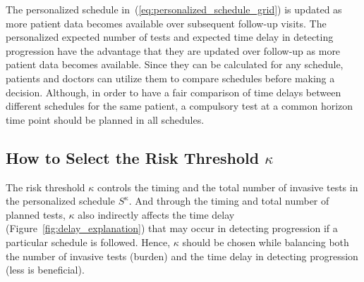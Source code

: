 The personalized schedule in~(\ref{eq:personalized_schedule_grid}) is updated as more patient data becomes available over subsequent follow-up visits. The personalized expected number of tests and expected time delay in detecting progression have the advantage that they are updated over follow-up as more patient data becomes available. Since they can be calculated for any schedule, patients and doctors can utilize them to compare schedules before making a decision. Although, in order to have a fair comparison of time delays between different schedules for the same patient, a compulsory test at a common horizon time point should be planned in all schedules.

\subsection{How to Select the Risk Threshold $\kappa$}
The risk threshold $\kappa$ controls the timing and the total number of invasive tests in the personalized schedule $S^\kappa$. And through the timing and total number of planned tests, $\kappa$ also indirectly affects the time delay (Figure~\ref{fig:delay_explanation}) that may occur in detecting progression if a particular schedule is followed. Hence, $\kappa$ should be chosen while balancing both the number of invasive tests (burden) and the time delay in detecting progression (less is beneficial).

